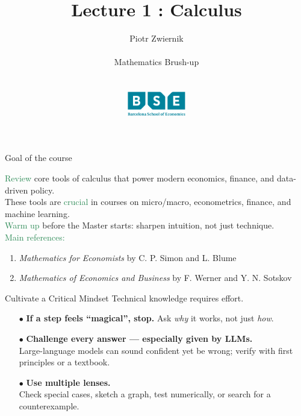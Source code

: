 \documentclass[11pt,aspectratio=169]{beamer}
\title[Calculus and Linear Algebra]{Lecture 1 : Calculus}
\author[Piotr Zwiernik, Barcelona School of Economics]{Piotr Zwiernik \\ $\;$\\
Mathematics Brush-up\\ $\;$\\ $\;$\\
\includegraphics[width=1in]{img/bse.png}  
}
\date{}
\begin{document}
\begin{frame}
\titlepage
\end{frame}





\begin{frame}{Goal of the course}

\textcolor{SeaGreen}{Review} core tools of calculus that power modern economics, finance, and data-driven policy.\\[6mm]

These tools are \textcolor{SeaGreen}{crucial} in courses on micro/macro, econometrics, finance, and machine learning.\\[6mm]

\textcolor{SeaGreen}{Warm up} before the Master starts: sharpen intuition, not just technique.\\[6mm]

\textcolor{SeaGreen}{Main references:} 
\begin{enumerate}
\item {\it Mathematics for Economists} by C. P. Simon and L. Blume
\item {\it Mathematics of Economics and Business} by F. Werner and Y. N. Sotskov
\end{enumerate}
\end{frame}

\begin{frame}{Cultivate a Critical Mindset}
Technical knowledge requires effort. 
\begin{itemize}
  \item[$\bullet$] \textbf{If a step feels ``magical'', stop.} Ask \emph{why} it works, not just \emph{how}.\\[3mm]
  \item[$\bullet$] \textbf{Challenge every answer --- especially given by LLMs.}\\
        Large-language models can sound confident yet be wrong; verify with first principles or a textbook.\\[3mm]
  \item[$\bullet$] \textbf{Use multiple lenses.}\\  
        Check special cases, sketch a graph, test numerically, or search for a counterexample.
\end{itemize}
\end{frame}
\end{document}
